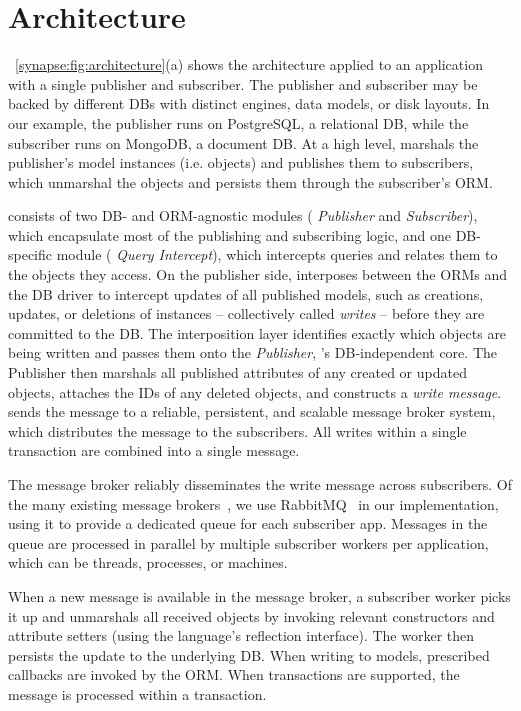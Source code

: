 \section{\synapse Architecture}
\label{synapse:sec:arch}

\F~\ref{synapse:fig:architecture}(a) shows the \synapse architecture applied to an
application with a single publisher and subscriber. The publisher and subscriber
may be backed by different DBs with distinct engines, data models, or disk
layouts. In our example, the publisher runs on PostgreSQL, a relational DB,
while the subscriber runs on MongoDB, a document DB. At a high level, \synapse
marshals the publisher's model instances (i.e. objects) and publishes them to
subscribers, which unmarshal the objects and persists them through the
subscriber's ORM.

\synapse consists of two DB- and ORM-agnostic modules ({\em \synapse
Publisher} and {\em \synapse Subscriber}), which encapsulate most of the
publishing and subscribing logic, and one DB-specific module ({\em \synapse
Query Intercept}), which intercepts queries and relates them to the objects they
access. On the publisher side, \synapse interposes between the ORMs and the DB
driver to intercept updates of all published models, such as creations, updates,
or deletions of instances -- collectively called {\em writes} -- before they are
committed to the DB. The interposition layer identifies exactly which objects
are being written and passes them onto the {\em \synapse Publisher},
\synapse's DB-independent core. The Publisher then marshals all published
attributes of any created or updated objects, attaches the IDs of any deleted
objects, and constructs a {\em write message}. \synapse sends the message to a
reliable, persistent, and scalable message broker system, which distributes the
message to the subscribers. All writes within a single transaction are combined
into a single message.

The message broker reliably disseminates the write message across subscribers.
Of the many existing message brokers~\cite{jms,kafka,pubsubhubbub,rabbitmq},
we use RabbitMQ~\cite{rabbitmq} in our implementation, using it to provide a
dedicated queue for each subscriber app. Messages in the queue are processed in
parallel by multiple subscriber workers per application, which can be threads,
processes, or machines.

When a new message is available in the message broker, a \synapse subscriber
worker picks it up and unmarshals all received objects by invoking relevant
constructors and attribute setters (using the language's reflection interface).
The worker then persists the update to the underlying DB. When writing to
models, prescribed callbacks are invoked by the ORM. When transactions are
supported, the message is processed within a transaction.

